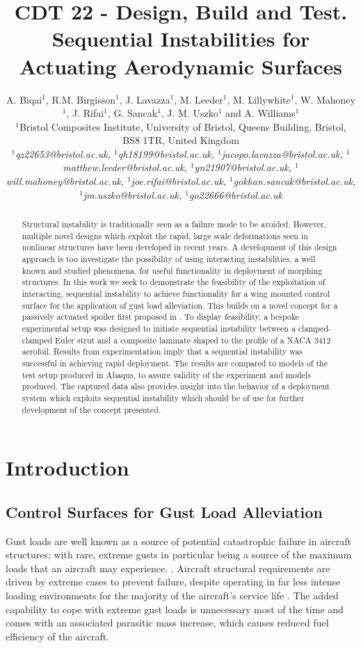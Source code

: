 \documentclass{IEEEtran}
\title{CDT 22 - Design, Build and Test.\\ Sequential Instabilities for Actuating Aerodynamic Surfaces}
\author{A. Biqai$^1$, R.M. Birgisson$^1$, J. Lavazza$^1$, M. Leeder$^1$, M. Lillywhite$^1$, W. Mahoney$^1$, J. Rifai$^1$, G. Sancak$^1$, J. M. Uszko$^1$ and A. Williams$^1$\\
	$^1$Bristol Composites Institute, University of Bristol, Queens Building, Bristol, BS8 1TR, United Kingdom\\
	\textit{$^1$qz22653@bristol.ac.uk, $^1$qh18199@bristol.ac.uk, $^1$jacopo.lavazza@bristol.ac.uk, $^1$matthew.leeder@bristol.ac.uk, $^1$yn21907@bristol.ac.uk, $^1$will.mahoney@bristol.ac.uk, $^1$joe.rifai@bristol.ac.uk, $^1$gokhan.sancak@bristol.ac.uk, $^1$jm.uszko@bristol.ac.uk, $^1$go22666@bristol.ac.uk}}
\begin{document}
	\maketitle
	
	\begin{abstract}
        Structural instability is traditionally seen as a failure mode to be avoided. However, multiple novel designs which exploit the rapid, large scale deformations seen in nonlinear structures have been developed in recent years. A development of this design approach is too investigate the possibility of using interacting instabilities, a well known and studied phenomena, for useful functionality in deployment of morphing structures. In this work we seek to demonstrate the feasibility of the exploitation of interacting, sequential instability to achieve functionality for a wing mounted control surface for the application of gust load alleviation. This builds on a novel concept for a passively actuated spoiler first proposed in \cite{Wheatcroft_2023}. To display feasibility, a bespoke experimental setup was designed to initiate sequential instability between a clamped-clamped Euler strut and a composite laminate shaped to the profile of a NACA 3412 aerofoil. Results from experimentation imply that a sequential instability was successful in achieving rapid deployment. The results are compared to models of the test setup produced in Abaqus, to assure validity of the experiment and models produced. The captured data also provides insight into the behavior of a deployment system which exploits sequential instability which should be of use for further development of the concept presented.
	\end{abstract}
	
	\section{Introduction}
		\subsection{Control Surfaces for Gust Load Alleviation}
		Gust loads are well known as a source of potential catastrophic failure in aircraft structures; with rare, extreme gusts in particular being a source of the maximum loads that an aircraft may experience. \cite{Wu2019,Guo_2015}. Aircraft structural requirements are driven by extreme cases to prevent failure, despite operating in far less intense loading environments for the majority of the aircraft's service life \cite{Li2021}. The added capability to cope with extreme gust loads is unnecessary most of the time and comes with an associated parasitic mass increase, which causes reduced fuel efficiency of the aircraft. 
		
\end{document}

